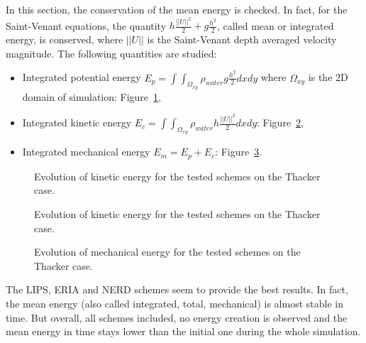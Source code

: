 In this section, the conservation of the mean energy is checked.
In fact, for the Saint-Venant equations, the quantity
$h \frac{||U||^2}{2} + g \frac{h^2}{2}$, called mean or integrated energy, is
conserved, where $||U||$ is the Saint-Venant depth averaged velocity magnitude.
The following quantities are studied:
\begin{itemize}
\item Integrated potential energy
  \textbf{$E_p =\int\int_{\Omega_{xy}}\rho_{water} g \frac{h^2}{2} dxdy$} where
  $\Omega_{xy}$ is the 2D domain of simulation: Figure~\ref{fig:thacker:Ep},
\item Integrated kinetic energy
  \textbf{$E_c =\int\int_{\Omega_{xy}} \rho_{water} h \frac{||U||^2}{2} dxdy$}:
  Figure~\ref{fig:thacker:Ec},
\item Integrated mechanical energy \textbf{$E_m = E_p + E_c$}:
  Figure~\ref{fig:thacker:Em}.
\end{itemize}

\begin{figure}[H]
\centering
  \caption{Evolution of kinetic energy for the tested schemes on the Thacker case.}
\label{fig:thacker:Ep}
\end{figure}

\begin{figure}[H]
\centering
  \caption{Evolution of kinetic energy for the tested schemes on the Thacker case.}
\label{fig:thacker:Ec}
\end{figure}

\begin{figure}[H]
\centering
  \caption{Evolution of mechanical energy for the tested schemes on the Thacker case.}
\label{fig:thacker:Em}
\end{figure}

The LIPS, ERIA and NERD schemes seem to provide the best results.
In fact, the mean energy (also called integrated, total, mechanical) is almost
stable in time.
But overall, all schemes included, no energy creation is observed and the mean
energy in time stays lower than the initial one during the whole simulation.

